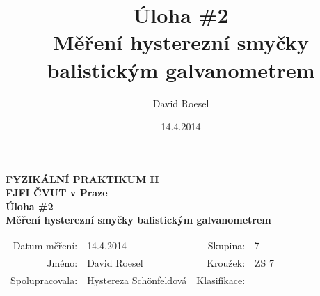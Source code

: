 \documentclass[english]{article}
\newcommand{\Author}{David Roesel}
\newcommand{\Coauthor}{Hystereza Schönfeldová}
\newcommand{\Institute}{FJFI ČVUT v Praze}
\newcommand{\Subject}{FYZIKÁLNÍ PRAKTIKUM II}
\newcommand{\Group}{7}
\newcommand{\Circle}{ZS 7}
\newcommand{\Title}{Úloha \#2  \\Měření hysterezní smyčky balistickým galvanometrem}
\newcommand{\Date}{14.4.2014}
\begin{document}
\author{\Author}
\title{\Title}
\date{\Date}

\renewcommand{\figurename}{Obr.}
\renewcommand{\tablename}{Tab.}
\renewcommand{\refname}{Reference}


\setlength{\parindent}{0cm}
\begin{multicols}{2}
\textbf{\Subject \\
        \Institute \\[0.1cm]
\Title \\[0.5cm]
}
\begin{tabular}{rlrl}
\large Datum měření: & \Date & \large Skupina: & \Group \\
\large Jméno: & \Author & \large Kroužek:  & \Circle\\
\large Spolupracovala: & \Coauthor &\large Klasifikace:\\
\end{tabular}


\end{multicols}
\end{document}
